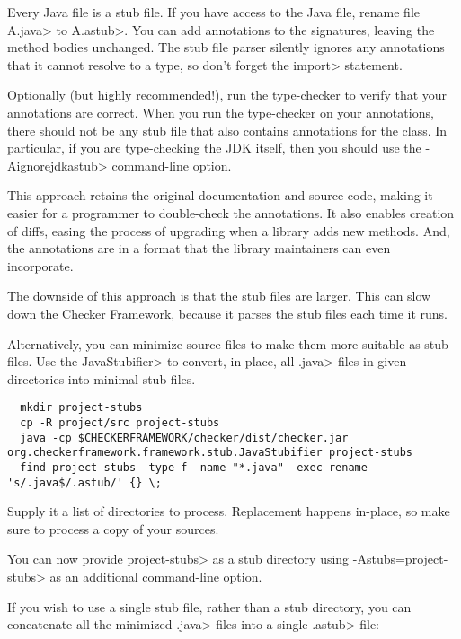 Every Java file is a stub file.  If you have access to the Java file,
rename file \<A.java> to \<A.astub>.  You can add
annotations to the signatures, leaving the method bodies unchanged.
The stub file parser silently ignores any annotations that it cannot
resolve to a type, so don't forget the \<import> statement.

Optionally (but highly recommended!), run the type-checker to verify that
your annotations are correct.  When you run the type-checker on your
annotations, there should not be any stub file that also contains
annotations for the class.  In particular, if you are type-checking the JDK
itself, then you should use the \<-Aignorejdkastub> command-line option.

This approach retains the original
documentation and source code, making it easier for a programmer to
double-check the annotations.  It also enables creation of diffs, easing
the process of upgrading when a library adds new methods.  And, the
annotations are in a format that the library maintainers can even
incorporate.

The downside of this approach is that the stub files are larger.  This can
slow down the Checker Framework, because it parses the stub files each time
it runs.

Alternatively, you can minimize source files to make them more suitable as stub files.
Use the \<JavaStubifier> to convert, in-place, all \<.java> files in given directories into
minimal stub files.

\begin{Verbatim}
  mkdir project-stubs
  cp -R project/src project-stubs
  java -cp $CHECKERFRAMEWORK/checker/dist/checker.jar org.checkerframework.framework.stub.JavaStubifier project-stubs
  find project-stubs -type f -name "*.java" -exec rename 's/.java$/.astub/' {} \;
\end{Verbatim}

Supply it a list of directories to process. Replacement happens in-place, so make sure to
process a copy of your sources.

You can now provide \<project-stubs> as a stub directory using \<-Astubs=project-stubs> as
an additional command-line option.

If you wish to use a single stub file, rather than a stub directory,
you can concatenate all the minimized \<.java> files into a single \<.astub> file:

